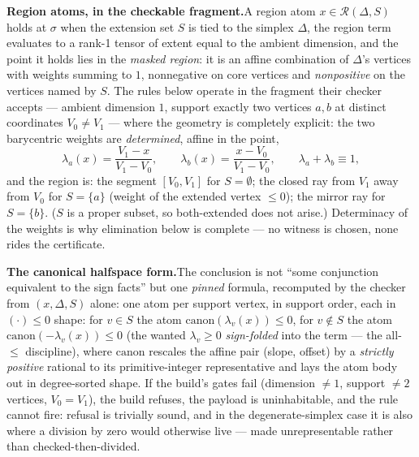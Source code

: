 

\textbf{Region atoms, in the checkable fragment.}\enspace A region atom
$x \in \mathcal{R}(\Delta, S)$ holds at $\sigma$ when the extension set
$S$ is tied to the simplex $\Delta$, the region term evaluates to a
rank-1 tensor of extent equal to the ambient dimension, and the point it
holds lies in the \emph{masked region}: it is an affine combination of
$\Delta$'s vertices with weights summing to $1$, nonnegative on core
vertices and \emph{nonpositive} on the vertices named by $S$. The rules
below operate in the fragment their checker accepts --- ambient dimension
$1$, support exactly two vertices $a, b$ at distinct coordinates
$V_0 \neq V_1$ --- where the geometry is completely explicit: the two
barycentric weights are \emph{determined}, affine in the point,
\[
\lambda_a(x) = \frac{V_1 - x}{V_1 - V_0}, \qquad
\lambda_b(x) = \frac{x - V_0}{V_1 - V_0}, \qquad
\lambda_a + \lambda_b \equiv 1,
\]
and the region is: the segment $[V_0, V_1]$ for $S = \emptyset$; the
closed ray from $V_1$ away from $V_0$ for $S = \{a\}$ (weight of the
extended vertex $\leq 0$); the mirror ray for $S = \{b\}$. ($S$ is a
proper subset, so both-extended does not arise.) Determinacy of the
weights is why elimination below is complete --- no witness is chosen,
none rides the certificate.

\textbf{The canonical halfspace form.}\enspace The conclusion is not
``some conjunction equivalent to the sign facts'' but one \emph{pinned}
formula, recomputed by the checker from $(x, \Delta, S)$ alone: one atom
per support vertex, in support order, each in $(\cdot) \leq 0$ shape:
for $v \in S$ the atom $\mathrm{canon}(\lambda_v(x)) \leq 0$, for
$v \notin S$ the atom $\mathrm{canon}(-\lambda_v(x)) \leq 0$ (the wanted
$\lambda_v \geq 0$ \emph{sign-folded} into the term --- the all-$\leq$
discipline), where $\mathrm{canon}$ rescales the affine pair
(slope, offset) by a \emph{strictly positive} rational to its
primitive-integer representative and lays the atom body out in
degree-sorted shape. If the build's gates fail (dimension $\neq 1$,
support $\neq 2$ vertices, $V_0 = V_1$), the build refuses, the payload
is uninhabitable, and the rule cannot fire: refusal is trivially sound,
and in the degenerate-simplex case it is also where a division by zero
would otherwise live --- made unrepresentable rather than checked-then-divided.

